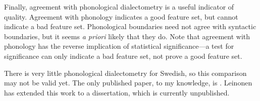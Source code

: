 Finally, agreement with phonological dialectometry is a useful
indicator of quality. Agreement with phonology indicates a good
feature set, but cannot indicate a bad feature set. Phonological
boundaries need not agree with syntactic boundaries, but it seems {\it
  a priori} likely that they do. Note that agreement with phonology
has the reverse implication of statistical
significance---a test for significance can only indicate a bad
feature set, not prove a good feature set.

There is very little phonological dialectometry for Swedish, so this
comparison may not be valid yet. The only published paper, to my
knowledge, is . Leinonen has extended this work
to a dissertation, which is currently unpublished.


